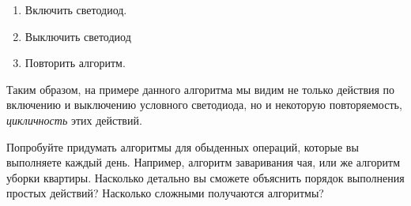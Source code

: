 \documentclass[../sparc.tex]{subfiles}
\begin{document}
\begin{enumerate}
\item Включить светодиод.
\item Выключить светодиод
\item Повторить алгоритм.
\end{enumerate}

Таким образом, на примере данного алгоритма мы видим не только действия по
включению и выключению условного светодиода, но и некоторую повторяемость,
\emph{цикличность} этих действий.

 { Попробуйте придумать алгоритмы для обыденных операций, которые
  вы выполняете каждый день.  Например, алгоритм заваривания чая, или же
  алгоритм уборки квартиры.  Насколько детально вы сможете объяснить порядок
  выполнения простых действий?  Насколько сложными получаются алгоритмы?}
\end{document}
